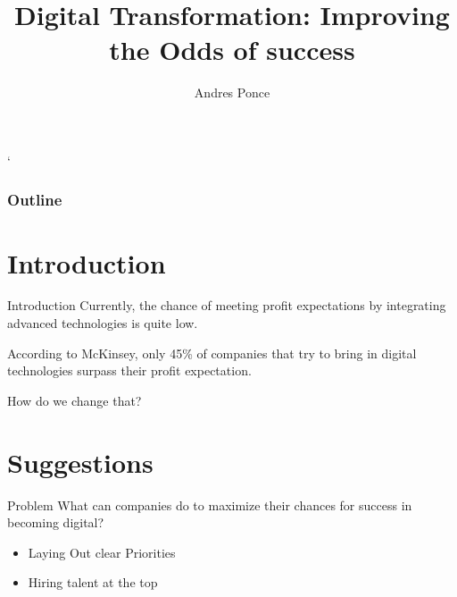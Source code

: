 \documentclass{beamer}
\title{Digital Transformation: Improving the Odds of success}
\author{Andres Ponce}
\institute{National Chiao Tung University}
\begin{document}
\maketitle
`	\begin{frame}
		\frametitle{Outline}
		\tableofcontents
	\end{frame}
	

	\section{Introduction}
	\begin{frame}{Introduction}
		Currently, the chance of meeting profit expectations by 
		integrating advanced technologies is quite low. 	

		According to McKinsey, only 45\% of companies that try to
		bring in digital technologies surpass their profit expectation.

		How do we change that?	
	\end{frame}

	\section{Suggestions}
	\begin{frame}{Problem}
		What can companies do to maximize their chances
		for success in becoming digital?
		\begin{itemize}
			\item{Laying Out clear Priorities}
			\item{Hiring talent at the top}
		\end{itemize}
	\end{frame}
	
	
\end{document}
